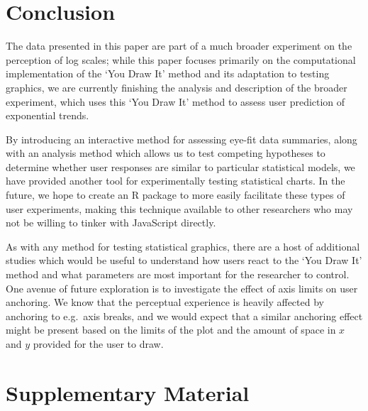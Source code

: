 \documentclass[
]{jds}
\begin{document}
\hypertarget{conclusion}{%
\section{Conclusion}\label{conclusion}}

The data presented in this paper are part of a much broader experiment
on the perception of log scales; while this paper focuses primarily on
the computational implementation of the `You Draw It' method and its
adaptation to testing graphics, we are currently finishing the analysis
and description of the broader experiment, which uses this `You Draw It'
method to assess user prediction of exponential trends.

By introducing an interactive method for assessing eye-fit data
summaries, along with an analysis method which allows us to test
competing hypotheses to determine whether user responses are similar to
particular statistical models, we have provided another tool for
experimentally testing statistical charts. In the future, we hope to
create an R package to more easily facilitate these types of user
experiments, making this technique available to other researchers who
may not be willing to tinker with JavaScript directly.

As with any method for testing statistical graphics, there are a host of
additional studies which would be useful to understand how users react
to the `You Draw It' method and what parameters are most important for
the researcher to control. One avenue of future exploration is to
investigate the effect of axis limits on user anchoring. We know that
the perceptual experience is heavily affected by anchoring to e.g.~axis
breaks, and we would expect that a similar anchoring effect might be
present based on the limits of the plot and the amount of space in \(x\)
and \(y\) provided for the user to draw.

\hypertarget{supplementary-material}{%
\section*{Supplementary Material}\label{supplementary-material}}
\end{document}
